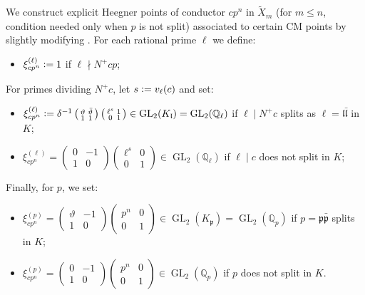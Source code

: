 \documentclass[a4paper]{amsart}
\numberwithin{equation}{section}
\theoremstyle{definition}
\newcommand{\Q}{\mathbb{Q}}
\newcommand{\defeq}{\vcentcolon=}
\DeclareMathOperator{\GL}{GL}
\begin{document}
We construct explicit Heegner points of conductor $cp^n$ in $\widetilde{X}_m$ (for $m\leq n$, condition needed only when $p$ is not split) associated to certain CM points by slightly modifying \cite{ChidaHsieh.2015, CastellaHsieh, ChidaHsieh.2018, CastellaLongo}. 
For each rational prime $\ell$ we define:
\begin{itemize}
\item $\xi_{cp^n}^{(\ell)}\defeq1$ if $\ell\nmid N^+cp$;
\end{itemize}
For primes dividing $N^+c$, let $s\defeq v_\ell(c)$ and set:
\begin{itemize}
\item $\xi_{cp^n}^{(\ell)}\defeq\delta^{-1}\left(\begin{smallmatrix}\vartheta & \bar{\vartheta} \\ 1 & 1\end{smallmatrix}\right)\left(\begin{smallmatrix}\ell^s & 1 \\ 0 & 1\end{smallmatrix}\right)\in \GL_2(K_\mathfrak{l})=\GL_2(\Q_\ell)$ if $\ell\mid N^+c$ splits as $\ell=\mathfrak{l}\bar{\mathfrak{l}}$ in $K$;
\item $\xi_{cp^n}^{(\ell)}=\left(\begin{smallmatrix}0 & -1 \\ 1 & 0\end{smallmatrix}\right)\left(\begin{smallmatrix}\ell^s & 0 \\ 0 & 1\end{smallmatrix}\right)\in \GL_2(\Q_\ell)$ if $\ell\mid c$ does not split in $K$;
\end{itemize}
Finally, for $p$, we set:
\begin{itemize}
\item $\xi_{cp^n}^{(p)}=\left(\begin{smallmatrix}\vartheta & -1 \\ 1 & 0\end{smallmatrix}\right)\left(\begin{smallmatrix}p^n & 0 \\ 0 & 1\end{smallmatrix}\right)\in \GL_2(K_\mathfrak{p})=\GL_2(\Q_p)$ if $p=\mathfrak{p}\bar{\mathfrak{p}}$ splits in $K$;
\item $\xi_{cp^n}^{(p)}=\left(\begin{smallmatrix}0 & -1 \\ 1 & 0\end{smallmatrix}\right)\left(\begin{smallmatrix}p^n & 0 \\ 0 & 1\end{smallmatrix}\right)\in \GL_2(\Q_p)$ if $p$ does not split in $K$.
\end{itemize}
\end{document}
